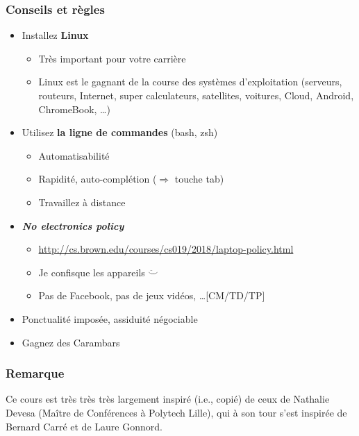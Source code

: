 \documentclass[12pt,svgnames]{beamer}
\begin{document}
\begin{frame}
	\frametitle{Conseils et règles}
	\begin{itemize}
		\item Installez \textbf{Linux}
		\begin{itemize}
			\item Très important pour votre carrière
			\item Linux est le gagnant de la course des systèmes d'exploitation (serveurs, routeurs, Internet, super calculateurs, satellites, voitures, Cloud, Android, ChromeBook, \ldots)
		\end{itemize}
		\item Utilisez \textbf{la ligne de commandes} (bash, zsh)
		\begin{itemize}
			\item Automatisabilité
			\item Rapidité, auto-complétion ($\Rightarrow$ touche tab)
			\item Travaillez à distance
		\end{itemize}
		\item \textbf{\textit{No electronics policy}}
		\begin{itemize}
		\item \url{http://cs.brown.edu/courses/cs019/2018/laptop-policy.html}
		\item Je confisque les appareils $\ddot\smile$
		\item Pas de Facebook, pas de jeux vidéos, \ldots [CM/TD/TP]
		\end{itemize}		
		\item Ponctualité imposée, assiduité négociable
		\item Gagnez des Carambars
	\end{itemize}
\end{frame}



\begin{frame}
	\frametitle{Remarque}
	\Large Ce cours est très très très largement inspiré (i.e., copié) de ceux de Nathalie Devesa (Maître de Conférences à Polytech Lille), qui à son tour s'est inspirée de Bernard Carré et de Laure Gonnord.
\end{frame}
\end{document}
